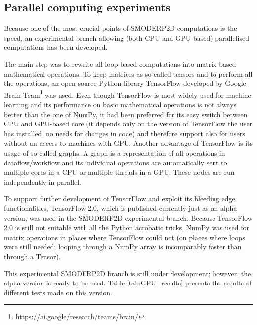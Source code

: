 \subsection{Parallel computing experiments}

Because one of the most crucial points of SMODERP2D computations is
the speed, an experimental branch allowing (both CPU and GPU-based)
parallelised computations has been developed.

The main step was to rewrite all loop-based computations into
matrix-based mathematical operations. To keep matrices as so-called
tensors and to perform all the operations, an open source Python
library TensorFlow \cite{tensorflow2015-whitepaper} developed by Google Brain
Team\footnote{https://ai.google/research/teams/brain/} was used. Even though
TensorFlow is most widely used for machine learning
and its performance on basic mathematical operations is not always better
than the one of NumPy, it had been preferred for its easy switch
between CPU and GPU-based core (it depends only on the version of
TensorFlow the user has installed, no needs for changes in code) and
therefore support also for users without an access to machines with
GPU. Another advantage of TensorFlow is its usage of so-called
graphs. A graph is a representation of all operations in
dataflow/workflow and its individual operations are automatically sent
to multiple cores in a CPU or multiple threads in a GPU. These nodes
are run independently in parallel.

To support further development of TensorFlow and exploit its bleeding
edge functionalities, TensorFlow 2.0, which is published currently
just as an alpha version, was used in the SMODERP2D experimental
branch. Because TensorFlow 2.0 is still not suitable with all the
Python acrobatic tricks, NumPy was used for matrix operations in
places where TensorFlow could not (on places where loops were still
needed; looping through a NumPy array is incomparably faster than
through a Tensor).

This experimental SMODERP2D branch is still under development;
however, the alpha-version is ready to be used. Table \ref{tab:GPU_results}
presents the results of different tests made on this version.

